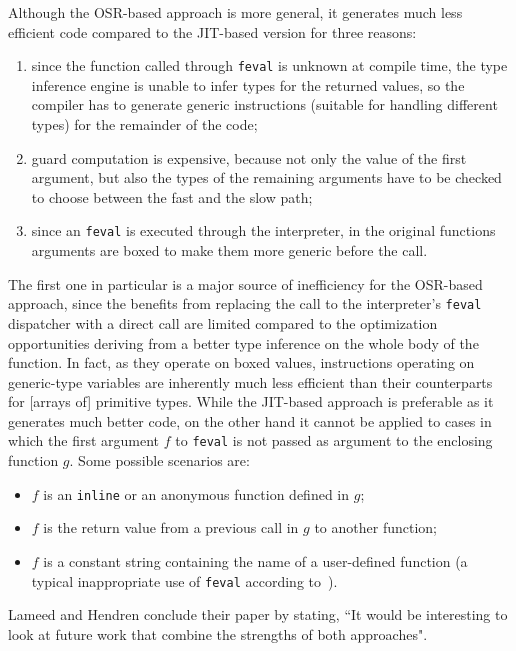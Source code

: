 Although the OSR-based approach is more general, it generates much less efficient code compared to the JIT-based version for three reasons:
\begin{enumerate}
\item since the function called through {\tt feval} is unknown at compile time, the type inference engine is unable to infer types for the returned values, so the compiler has to generate generic instructions (suitable for handling different types) for the remainder of the code;
\item guard computation is expensive, because not only the value of the first argument, but also the types of the remaining arguments have to be checked to choose between the fast and the slow path;
\item since an {\tt feval} is executed through the interpreter, in the original functions arguments are boxed to make them more generic before the call.
\end{enumerate}

The first one in particular is a major source of inefficiency for the OSR-based approach, since the benefits from replacing the call to the interpreter's {\tt feval} dispatcher with a direct call are limited compared to the optimization opportunities deriving from a better type inference on the whole body of the function. In fact, as they operate on boxed values, instructions operating on generic-type variables are inherently much less efficient than their counterparts for [arrays of] primitive types. While the JIT-based approach is preferable as it generates much better code, on the other hand it cannot be applied to cases in which the first argument $f$ to {\tt feval} is not passed as argument to the enclosing function $g$. Some possible scenarios are:
\begin{itemize}
\item $f$ is an {\tt inline} or an anonymous function defined in $g$;
\item $f$ is the return value from a previous call in $g$ to another function;
\item $f$ is a constant string containing the name of a user-defined function (a typical inappropriate use of {\tt feval} according to~\cite{radpour2013refactoring}).
\end{itemize}
 
Lameed and Hendren conclude their paper by stating, ``It would be interesting to look at future work that combine the
strengths of both approaches".
  
  
  
  